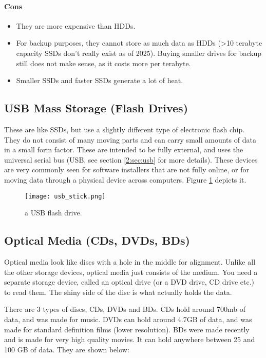 \documentclass[../main.tex]{subfiles}
\begin{document}
\paragraph{Cons}
\begin{itemize}
    \item They are more expensive than HDDs.
    \item For backup purposes, they cannot store as much data as HDDs (>10 terabyte capacity SSDs don't really exist as of 2025). Buying smaller drives for backup still does not make sense, as it costs more per terabyte.
    \item Smaller SSDs and faster SSDs generate a lot of heat.
\end{itemize}

\subsection{USB Mass Storage (Flash Drives)}

These are like SSDs, but use a slightly different type of electronic flash chip. They do not consist of many moving parts and can carry small amounts of data in a small form factor. These are intended to be fully external, and uses the universal serial bus (USB, see section \ref{2:sec:usb} for more details). These devices are very commonly seen for software installers that are not fully online, or for moving data through a physical device across computers. Figure \ref{fig:usb_stick} depicts it.

\begin{figure}[H]
    \centering
    \texttt{[image: usb\_stick.png]}
    \caption{a USB flash drive.}
    \label{fig:usb_stick}
\end{figure}

\subsection{Optical Media (CDs, DVDs, BDs)}
\label{3:sec:optical_media}

Optical media look like discs with a hole in the middle for alignment. Unlike all the other storage devices, optical media just consists of the medium. You need a separate storage device, called an optical drive (or a DVD drive, CD drive etc.) to read them. The shiny side of the disc is what actually holds the data. 

There are 3 types of discs, CDs, DVDs and BDs. CDs hold around 700mb of data, and was made for music. DVDs can hold around 4.7GB of data, and was made for standard definition films (lower resolution). BDs were made recently and is made for very high quality movies. It can hold anywhere between 25 and 100 GB of data. They are shown below:
\end{document}
